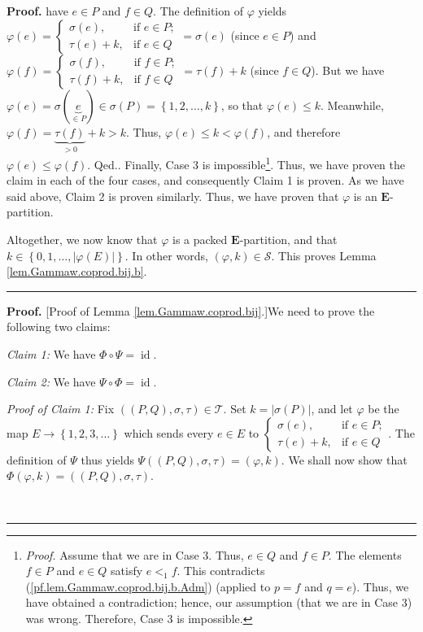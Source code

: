 \documentclass[numbers=enddot,12pt,final,onecolumn,notitlepage,abstracton]{scrartcl}
\theoremstyle{definition}
\newenvironment{proof}[1][Proof]{\noindent\textbf{#1.} }{\ \rule{0.5em}{0.5em}}
\newenvironment{verlong}{}{}
\newcommand{\id}{{\operatorname{id}}}
\newcommand{\EE}{{\mathbf{E}}}
\begin{document}
\begin{verlong}
\begin{proof}
{have $e\in P$ and $f\in Q$. The definition of $\varphi$ yields $\varphi\left(
e\right)  =
\begin{cases}
\sigma\left(  e\right)  , & \text{if }e\in P;\\
\tau\left(  e\right)  +k, & \text{if }e\in Q
\end{cases}
=\sigma\left(  e\right)  $ (since $e\in P$) and $\varphi\left(  f\right)  =%
\begin{cases}
\sigma\left(  f\right)  , & \text{if }f\in P;\\
\tau\left(  f\right)  +k, & \text{if }f\in Q
\end{cases}
=\tau\left(  f\right)  +k$ (since $f\in Q$). But we have $\varphi\left(
e\right)  =\sigma\left(  \underbrace{e}_{\in P}\right)  \in\sigma\left(
P\right)  =\left\{  1,2,\ldots,k\right\}  $, so that $\varphi\left(  e\right)
\leq k$. Meanwhile, $\varphi\left(  f\right)  =\underbrace{\tau\left(
f\right)  }_{>0}+k>k$. Thus, $\varphi\left(  e\right)  \leq k<\varphi\left(
f\right)  $, and therefore $\varphi\left(  e\right)  \leq\varphi\left(
f\right)  $. Qed.}. Finally, Case 3 is impossible\footnote{\textit{Proof.}
Assume that we are in Case 3. Thus, $e\in Q$ and $f\in P$. The elements $f\in
P$ and $e\in Q$ satisfy $e<_{1}f$. This contradicts
(\ref{pf.lem.Gammaw.coprod.bij.b.Adm}) (applied to $p=f$ and $q=e$). Thus, we
have obtained a contradiction; hence, our assumption (that we are in Case 3)
was wrong. Therefore, Case 3 is impossible.}. Thus, we have proven the claim
in each of the four cases, and consequently Claim 1 is proven. As we have said
above, Claim 2 is proven similarly. Thus, we have proven that $\varphi$ is an
$\EE$-partition.

Altogether, we now know that $\varphi$ is a packed $\EE$-partition,
and that \newline
$k\in\left\{  0,1,\ldots,\left\vert \varphi\left(  E\right)
\right\vert \right\}  $. In other words, $\left(  \varphi,k\right)
\in\mathcal{S}$. This proves Lemma \ref{lem.Gammaw.coprod.bij.b}.
\end{proof}

\begin{proof}
[Proof of Lemma \ref{lem.Gammaw.coprod.bij}.]We need to prove the following
two claims:

\textit{Claim 1:} We have $\Phi\circ\Psi=\id$.

\textit{Claim 2:} We have $\Psi\circ\Phi=\id$.

\textit{Proof of Claim 1:} Fix $\left(  \left(  P,Q\right)  ,\sigma
,\tau\right)  \in\mathcal{T}$. Set $k=\left\vert \sigma\left(  P\right)
\right\vert $, and let $\varphi$ be the map $E\rightarrow\left\{
1,2,3,\ldots\right\}  $ which sends every $e\in E$ to $%
\begin{cases}
\sigma\left(  e\right)  , & \text{if }e\in P;\\
\tau\left(  e\right)  +k, & \text{if }e\in Q
\end{cases}
$. The definition of $\Psi$ thus yields $\Psi\left(  \left(  P,Q\right)
,\sigma,\tau\right)  =\left(  \varphi,k\right)  $. We shall now show that
$\Phi\left(  \varphi,k\right)  =\left(  \left(  P,Q\right)  ,\sigma
,\tau\right)  $.


\end{proof}
\end{verlong}
\end{document}
